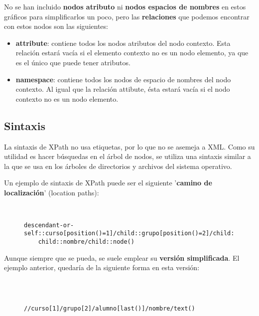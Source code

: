 No se han incluido \textbf{nodos atributo} ni \textbf{nodos espacios de nombres} en estos gráficos para simplificarlos un poco, pero las \textbf{relaciones} que podemos encontrar con estos nodos son las siguientes:

\begin{itemize}
    \item \textbf{attribute}: contiene todos los nodos atributos del nodo contexto. Esta relación estará vacía si el elemento contexto no es un nodo elemento, ya que es el único que puede tener atributos.
    \item \textbf{namespace}: contiene todos los nodos de espacio de nombres del nodo contexto. Al igual que la relación attibute, ésta estará vacía si el nodo contexto no es un nodo elemento.
\end{itemize}

\subsection{Sintaxis}
La sintaxis de XPath no usa etiquetas, por lo que no se asemeja a XML. Como su utilidad es hacer búsquedas en el árbol de nodos, se utiliza una sintaxis similar a la que se usa en los árboles de directorios y archivos del sistema operativo.

Un ejemplo de sintaxis de XPath puede ser el siguiente '\textbf{camino de localización}' (location paths):

\begin{figure}[h]
    \begin{tcolorbox}[sharp corners, colback=yellow!30, colframe=white!20]
        \scriptsize
        \begin{verbatim}


descendant-or-self::curso[position()=1]/child::grupo[position()=2]/child::alumno[last()]/
    child::nombre/child::node()
        \end{verbatim}
    \end{tcolorbox}
\end{figure}

Aunque siempre que se pueda, se suele emplear su \textbf{versión simplificada}. El ejemplo anterior, quedaría de la siguiente forma en esta versión:

\begin{figure}[H]
    \begin{tcolorbox}[sharp corners, colback=yellow!30, colframe=white!20]
        \scriptsize
        \begin{verbatim}


                   //curso[1]/grupo[2]/alumno[last()]/nombre/text()
        \end{verbatim}
    \end{tcolorbox}
\end{figure}

